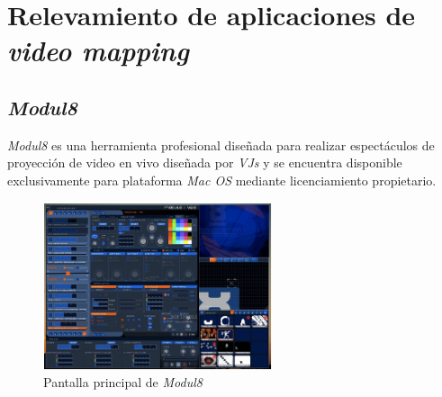 ﻿\chapter{Relevamiento de aplicaciones de \emph{video mapping}}
\section{\emph{Modul8}}
\emph{Modul8}\cite{Module8} es una herramienta profesional diseñada para realizar espectáculos de proyección de video en vivo diseñada por \emph{VJs} y se encuentra disponible exclusivamente para plataforma \emph{Mac OS} mediante licenciamiento propietario.

\begin{figure}[H]
  \centering
    \includegraphics[width=0.6\textwidth]{./Cap3_aplicaciones/apps-modul8.png}
  \caption{Pantalla principal de \emph{Modul8}}
  \label{fig:Apps-Module8}
\end{figure}

